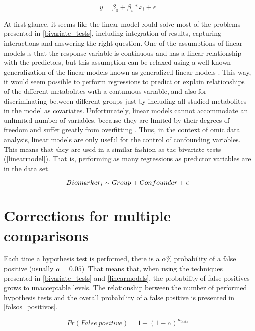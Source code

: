 \begin{equation}
\label{equation06}
y=\beta_0 + \beta_i * x_i + \epsilon
\end{equation}

At first glance, it seems like the linear model could solve most of the problems presented in \autoref{bivariate_tests}, including integration of results, capturing interactions and answering the right question. One of the assumptions of linear models is that the response variable is continuous and has a linear relationship with the predictors, but this assumption can be relaxed using a well known generalization of the linear models known as generalized linear models \parencite{mcculloch2000generalized}. This way, it would seem possible to perform regressions to predict or explain relationships of the different metabolites with a continuous variable, and also for discriminating between different groups just by including all studied metabolites in the model as covariates. Unfortunately, linear models cannot accommodate an unlimited number of variables, because they are limited by their degrees of freedom and suffer greatly from overfitting \parencite{babyak2004you, hawkins2004problem}. Thus, in the context of omic data analysis, linear models are only useful for the control of confounding variables. This means that they are used in a similar fashion as the bivariate tests (\autoref{linearmodel}). That is, performing as many regressions as predictor variables are in the data set.

\begin{equation}
\label{linearmodel}
Biomarker_i\ {\raise.17ex\hbox{$\scriptstyle\sim$}}\ Group + Confounder + \epsilon
\end{equation}


\section{Corrections for multiple comparisons}
Each time a hypothesis test is performed, there is a $\alpha\%$ probability of a false positive (usually $\alpha = 0.05$). That means that, when using the techniques presented in \autoref{bivariate_tests} and \autoref{linearmodels}, the probability of false positives grows to unacceptable levels. The relationship between the number of performed hypothesis tests and the overall probability of a false positive is presented in \autoref{falsos_positivos}.

\begin{equation}
\label{falsos_positivos}
    Pr(False\ positive) = 1-(1-\alpha)^{n_{tests}}
\end{equation}

